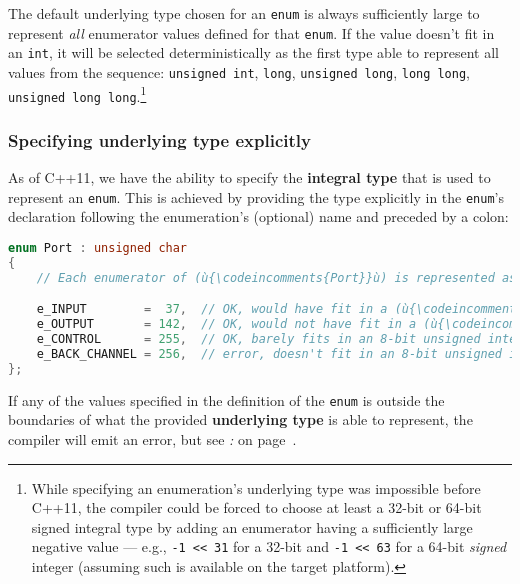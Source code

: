\noindent The default underlying type chosen for an \texttt{enum} is always
sufficiently large to represent \emph{all} enumerator values defined for
that \texttt{enum}. If the value doesn't fit in an \texttt{int}, it will
be selected deterministically as the first type able to represent all
values from the sequence: \texttt{unsigned}~\texttt{int}, \texttt{long},
\texttt{unsigned}~\texttt{long}, \texttt{long}~\texttt{long},
\texttt{unsigned}~\texttt{long}~\texttt{long}.{\cprotect\footnote{While
specifying an enumeration's underlying type was impossible before
C++11, the compiler could be forced to choose at least a 32-bit or
64-bit signed integral type by adding an enumerator having a
sufficiently large negative value --- e.g.,
\texttt{-1}~\texttt{<<}~\texttt{31} for a 32-bit and
\texttt{-1}~\texttt{<<}~\texttt{63} for a 64-bit \emph{signed} integer
  (assuming such is available on the target platform).}}

\subsubsection[Specifying underlying type explicitly]{Specifying underlying type explicitly}\label{specifying-underlying-type-explicitly}

As of C++11, we have the ability to specify the \textbf{integral type}
that is used to represent an \texttt{enum}. This is achieved by
providing the type explicitly in the \texttt{enum}'s declaration
following the enumeration's (optional) name and preceded by a colon:

\begin{lstlisting}[language=C++]
enum Port : unsigned char
{
    // Each enumerator of (ù{\codeincomments{Port}}ù) is represented as an (ù{\codeincomments{unsigned char}}ù) type.

    e_INPUT        =  37,  // OK, would have fit in a (ù{\codeincomments{signed char}}ù) too
    e_OUTPUT       = 142,  // OK, would not have fit in a (ù{\codeincomments{signed char}}ù)
    e_CONTROL      = 255,  // OK, barely fits in an 8-bit unsigned integer
    e_BACK_CHANNEL = 256,  // error, doesn't fit in an 8-bit unsigned integer
};
\end{lstlisting}
    
\noindent If any of the values specified in the definition of the \texttt{enum} is
outside the boundaries of what the provided \textbf{underlying type} is
able to represent, the compiler will emit an error, but see \textit{: } on page~\pageref{subtleties-of-integral-promotion}.

